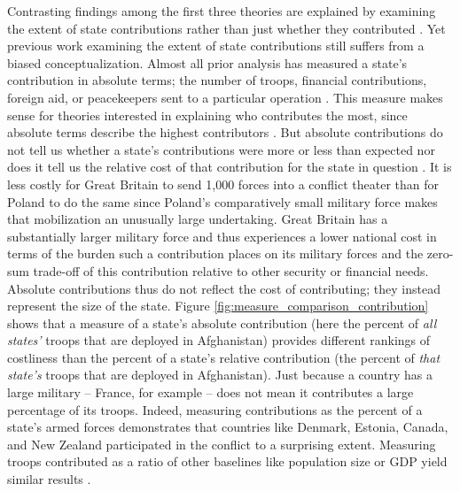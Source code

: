 \documentclass[12pt,letterpaper]{article}
\begin{document}
		Contrasting findings among the first three theories are explained by examining the extent of state contributions rather than just whether they contributed \citep[4]{cranmer_coalitionqualitymultinational_2017}. Yet previous work examining the extent of state contributions still suffers from a biased conceptualization. Almost all prior analysis has measured a state's contribution in absolute terms; the number of troops, financial contributions, foreign aid, or peacekeepers sent to a particular operation \citep{mello_democraticparticipationarmed_2014, haesebrouck_explainingmemberstates_2016}. This measure makes sense for theories interested in explaining who contributes the most, since absolute terms describe the highest contributors \citep[40-41]{bogers_missionafghanistanwho_2013}. But absolute contributions do not tell us whether a state's contributions were more or less than expected nor does it tell us the relative cost of that contribution for the state in question \citep{kreps_eliteconsensusdeterminant_2010}. It is less costly for Great Britain to send 1,000 forces into a conflict theater than for Poland to do the same since Poland's comparatively small military force makes that mobilization an unusually large undertaking. Great Britain has a substantially larger military force and thus experiences a lower national cost in terms of the burden such a contribution places on its military forces and the zero-sum trade-off of this contribution relative to other security or financial needs. Absolute contributions thus do not reflect the cost of contributing; they instead represent the size of the state. Figure \ref{fig:measure_comparison_contribution} shows that a measure of a state's absolute contribution (here the percent of \emph{all states'} troops that are deployed in Afghanistan) provides different rankings of costliness than the percent of a state's relative contribution (the percent of \textit{that state's} troops that are deployed in Afghanistan). Just because a country has a large military -- France, for example -- does not mean it contributes a large percentage of its troops. Indeed, measuring contributions as the percent of a state's armed forces demonstrates that countries like Denmark, Estonia, Canada, and New Zealand participated in the conflict to a surprising extent. Measuring troops contributed as a ratio of other baselines like population size or GDP yield similar results \citep[41]{bogers_missionafghanistanwho_2013}.
\end{document}
